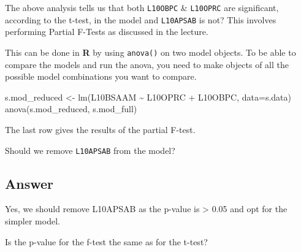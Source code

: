 \documentclass[
  10pt,
  letterpaper,
  DIV=11,
  numbers=noendperiod]{scrartcl}
\newenvironment{Shaded}{\begin{snugshade}}{\end{snugshade}}
\newcommand{\AttributeTok}[1]{\textcolor[rgb]{0.40,0.45,0.13}{#1}}
\newcommand{\FunctionTok}[1]{\textcolor[rgb]{0.28,0.35,0.67}{#1}}
\newcommand{\NormalTok}[1]{\textcolor[rgb]{0.00,0.23,0.31}{#1}}
\newcommand{\OtherTok}[1]{\textcolor[rgb]{0.00,0.23,0.31}{#1}}
\newcommand{\SpecialCharTok}[1]{\textcolor[rgb]{0.37,0.37,0.37}{#1}}
\begin{document}
The above analysis tells us that both \texttt{L10OBPC} \&
\texttt{L10OPRC} are significant, according to the t-test, in the model
and \texttt{L10APSAB} is not? This involves performing Partial F-Tests
as discussed in the lecture.

This can be done in \textbf{R} by using \texttt{anova()} on two model
objects. To be able to compare the models and run the anova, you need to
make objects of all the possible model combinations you want to compare.

\begin{Shaded}
\begin{Highlighting}[]
\NormalTok{s.mod\_reduced }\OtherTok{\textless{}{-}} \FunctionTok{lm}\NormalTok{(L10BSAAM }\SpecialCharTok{\textasciitilde{}}\NormalTok{ L10OPRC }\SpecialCharTok{+}\NormalTok{ L10OBPC, }\AttributeTok{data=}\NormalTok{s.data)}
\FunctionTok{anova}\NormalTok{(s.mod\_reduced, s.mod\_full)}
\end{Highlighting}
\end{Shaded}

The last row gives the results of the partial F-test.

\begin{tcolorbox}[enhanced jigsaw, rightrule=.15mm, coltitle=black, leftrule=.75mm, titlerule=0mm, breakable, toprule=.15mm, bottomtitle=1mm, colback=white, toptitle=1mm, opacitybacktitle=0.6, bottomrule=.15mm, arc=.35mm, left=2mm, title=\textcolor{quarto-callout-warning-color}{\faExclamationTriangle}\hspace{0.5em}{Question 1}, colbacktitle=quarto-callout-warning-color!10!white, opacityback=0, colframe=quarto-callout-warning-color-frame]

Should we remove \texttt{L10APSAB} from the model?

\end{tcolorbox}

\hypertarget{answer-13}{%
\subsection{Answer}\label{answer-13}}

Yes, we should remove L10APSAB as the p-value is \textgreater{} 0.05 and
opt for the simpler model.

\begin{tcolorbox}[enhanced jigsaw, rightrule=.15mm, coltitle=black, leftrule=.75mm, titlerule=0mm, breakable, toprule=.15mm, bottomtitle=1mm, colback=white, toptitle=1mm, opacitybacktitle=0.6, bottomrule=.15mm, arc=.35mm, left=2mm, title=\textcolor{quarto-callout-warning-color}{\faExclamationTriangle}\hspace{0.5em}{Question 2}, colbacktitle=quarto-callout-warning-color!10!white, opacityback=0, colframe=quarto-callout-warning-color-frame]

Is the p-value for the f-test the same as for the t-test?

\end{tcolorbox}
\end{document}
